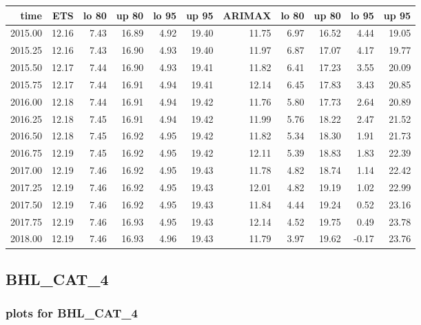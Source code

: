 \documentclass[10pt,a4paper]{article}\usepackage[]{graphicx}\usepackage[]{color}
\newcommand{\AaA}{\_}
\begin{document}
\begin{table}[ht]
\centering
\begin{tabular}{rrrrrrrrrrr}
  \hline
time & ETS  & lo 80 & up 80 & lo 95 & up 95 & ARIMAX  & lo 80 & up 80 & lo 95 & up 95 \\ 
  \hline
2015.00 & 12.16 & 7.43 & 16.89 & 4.92 & 19.40 & 11.75 & 6.97 & 16.52 & 4.44 & 19.05 \\ 
  2015.25 & 12.16 & 7.43 & 16.90 & 4.93 & 19.40 & 11.97 & 6.87 & 17.07 & 4.17 & 19.77 \\ 
  2015.50 & 12.17 & 7.44 & 16.90 & 4.93 & 19.41 & 11.82 & 6.41 & 17.23 & 3.55 & 20.09 \\ 
  2015.75 & 12.17 & 7.44 & 16.91 & 4.94 & 19.41 & 12.14 & 6.45 & 17.83 & 3.43 & 20.85 \\ 
  2016.00 & 12.18 & 7.44 & 16.91 & 4.94 & 19.42 & 11.76 & 5.80 & 17.73 & 2.64 & 20.89 \\ 
  2016.25 & 12.18 & 7.45 & 16.91 & 4.94 & 19.42 & 11.99 & 5.76 & 18.22 & 2.47 & 21.52 \\ 
  2016.50 & 12.18 & 7.45 & 16.92 & 4.95 & 19.42 & 11.82 & 5.34 & 18.30 & 1.91 & 21.73 \\ 
  2016.75 & 12.19 & 7.45 & 16.92 & 4.95 & 19.42 & 12.11 & 5.39 & 18.83 & 1.83 & 22.39 \\ 
  2017.00 & 12.19 & 7.46 & 16.92 & 4.95 & 19.43 & 11.78 & 4.82 & 18.74 & 1.14 & 22.42 \\ 
  2017.25 & 12.19 & 7.46 & 16.92 & 4.95 & 19.43 & 12.01 & 4.82 & 19.19 & 1.02 & 22.99 \\ 
  2017.50 & 12.19 & 7.46 & 16.92 & 4.95 & 19.43 & 11.84 & 4.44 & 19.24 & 0.52 & 23.16 \\ 
  2017.75 & 12.19 & 7.46 & 16.93 & 4.95 & 19.43 & 12.14 & 4.52 & 19.75 & 0.49 & 23.78 \\ 
  2018.00 & 12.19 & 7.46 & 16.93 & 4.96 & 19.43 & 11.79 & 3.97 & 19.62 & -0.17 & 23.76 \\ 
   \hline
\end{tabular}
\end{table}

\newpage
\subsection{BHL\AaA CAT\AaA 4}
\subsubsection{plots for BHL\AaA CAT\AaA 4}
\end{document}
